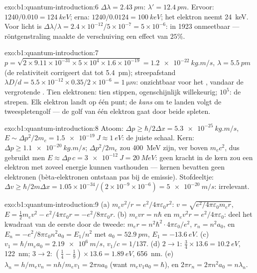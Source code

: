 \begin{solution}{exo:b1:quantum-introduction:6}
$\Delta\lambda = \qty{2.43}{pm}$: $\lambda' = \qty{12.4}{pm}$. Ervoor: $1240/0.010 =
\qty{124}{keV}$; erna: $1240/0.0124 = \qty{100}{keV}$; het elektron neemt
\qty{24}{keV}. Voor licht is $\Delta\lambda/\lambda = 2.4 \times 10^{-12}/5 \times 10^{-7} = 5 \times
10^{-6}$: in 1923 onmeetbaar --- röntgenstraling maakte de verschuiving een effect van $25\%$.
\end{solution}

\begin{solution}{exo:b1:quantum-introduction:7}
$p = \sqrt{2 \times 9.11 \times 10^{-31} \times 5 \times 10^4 \times 1.6 \times 10^{-19}} =
\qty{1.2e-22}{kg.m/s}$, $\lambda = \qty{5.5}{pm}$ (de relativiteit corrigeert dat tot
\qty{5.4}{pm}); streepafstand $\lambda D/d = 5.5 \times 10^{-12} \times 0.35/2 \times 10^{-6}
= \qty{1}{\micro m}$: onzichtbaar voor het , vandaar de vergrotende . Tien
elektronen: tien stippen, ogenschijnlijk willekeurig; $10^5$: de strepen. Elk
elektron landt op één punt; de \emph{kans} om te landen volgt
de tweespletengolf --- de golf van één elektron gaat door beide spleten.
\end{solution}

\begin{solution}{exo:b1:quantum-introduction:8}
Atoom: $\Delta p \geq \hbar/2\Delta x = \qty{5.3e-25}{kg.m/s}$, $E \sim \Delta p^2/2m_e =
\qty{1.5e-19}{J} \approx \qty{1}{eV}$: de juiste schaal. Kern: $\Delta p \geq
\qty{1.1e-20}{kg.m/s}$; $\Delta p^2/2m_e$ zou \qty{400}{MeV} zijn, ver boven
$m_ec^2$, dus gebruikt men $E \approx \Delta p\,c = \qty{3e-12}{J} = \qty{20}{MeV}$: geen kracht
in de kern zou een elektron met zoveel energie kunnen vasthouden --- kernen bevatten
geen elektronen (bèta-elektronen ontstaan pas bij de emissie). Stofdeeltje: $\Delta v \geq
\hbar/2m\Delta x = 1.05 \times 10^{-34}/(2 \times 10^{-9} \times 10^{-6}) = \qty{5e-20}{m/s}$:
irrelevant.
\end{solution}

\begin{solution}{exo:b1:quantum-introduction:9}
(a) $m_ev^2/r = e^2/4\pi\varepsilon_0r^2$: $v = \sqrt{e^2/4\pi\varepsilon_0m_er}$, $E =
\tfrac12m_ev^2 - e^2/4\pi\varepsilon_0r = -e^2/8\pi\varepsilon_0r$. (b) $m_evr = n\hbar$ en
$m_ev^2r = e^2/4\pi\varepsilon_0$: deel het kwadraat van de eerste door de tweede:
$m_er = n^2\hbar^2 \cdot 4\pi\varepsilon_0/e^2$, $r_n = n^2a_0$, en $E_n = -e^2/8\pi\varepsilon_0n^2a_0
= E_1/n^2$ met $a_0 = \qty{52.9}{pm}$, $E_1 = \qty{-13.6}{eV}$. (c) $v_1 =
\hbar/m_ea_0 = \qty{2.19e6}{m/s}$, $v_1/c = 1/137$. (d) $2 \to 1$: $\tfrac34 \times
13.6 = \qty{10.2}{eV}$, \qty{122}{nm}; $3 \to 2$: $(\tfrac14 - \tfrac19) \times 13.6 =
\qty{1.89}{eV}$, \qty{656}{nm}. (e) $\lambda_n = h/m_ev_n = nh/m_ev_1 = 2\pi na_0$
(want $m_ev_1a_0 = \hbar$), en $2\pi r_n = 2\pi n^2a_0 = n\lambda_n$.
\end{solution}

